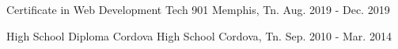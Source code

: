 

\begin{cventries}

  \cventry
    {Certificate in Web Development} %
    {Tech 901} %
    {Memphis, Tn.} %
    {Aug. 2019 - Dec. 2019} %
    { }

  \cventry
    { High School Diploma } %
    {Cordova High School} %
    {Cordova, Tn.} %
    {Sep. 2010 - Mar. 2014} %
    {  }

\end{cventries}
